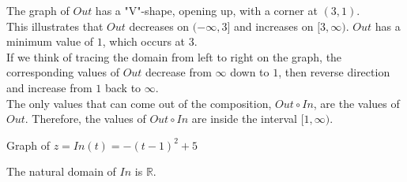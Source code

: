 \documentclass{ximera}
\begin{document}
The graph of $Out$ has a "V"-shape, opening up, with a corner at $(3,1)$. \\
This illustrates that $Out$ decreases on $(-\infty, 3]$ and increases on $[3, \infty)$.  $Out$ has a minimum value of $1$, which occurs at $3$. \\

If we think of tracing the domain from left to right on the graph, the corresponding values of $Out$ decrease from $\infty$ down to $1$, then reverse direction and increase from $1$ back to $\infty$. \\



The only values that can come out of the composition, $Out \circ In$, are the values of $Out$. Therefore, the values of $Out \circ In$ are inside the interval $[1, \infty)$.  



Graph of $z = In(t) = -(t-1)^2 + 5$





\begin{image}
\end{image}
The natural domain of $In$ is $\mathbb{R}$. \\
\end{document}
